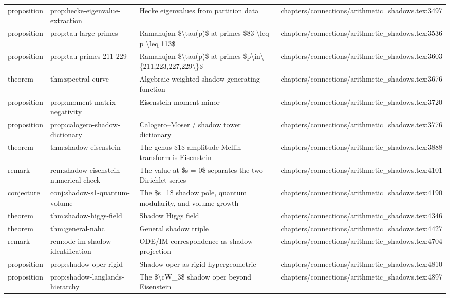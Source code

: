 \documentclass[11pt]{article}
\begin{document}
\begin{longtable}{L{0.10\textwidth}L{0.26\textwidth}L{0.42\textwidth}L{0.22\textwidth}}
proposition & prop:hecke-eigenvalue-extraction & Hecke eigenvalues from partition data & chapters/connections/arithmetic\_shadows.tex:3497\\
proposition & prop:tau-large-primes & Ramanujan \$\textbackslash{}tau(p)\$ at primes \$83 \textbackslash{}leq p \textbackslash{}leq 113\$ & chapters/connections/arithmetic\_shadows.tex:3536\\
proposition & prop:tau-primes-211-229 & Ramanujan \$\textbackslash{}tau(p)\$ at primes \$p\textbackslash{}in\textbackslash{}\{211,223,227,229\textbackslash{}\}\$ & chapters/connections/arithmetic\_shadows.tex:3603\\
theorem & thm:spectral-curve & Algebraic weighted shadow generating function & chapters/connections/arithmetic\_shadows.tex:3676\\
proposition & prop:moment-matrix-negativity & Eisenstein moment minor & chapters/connections/arithmetic\_shadows.tex:3720\\
proposition & prop:calogero-shadow-dictionary & Calogero--Moser / shadow tower dictionary & chapters/connections/arithmetic\_shadows.tex:3776\\
theorem & thm:shadow-eisenstein & The genus-\$1\$ amplitude Mellin transform is Eisenstein & chapters/connections/arithmetic\_shadows.tex:3888\\
remark & rem:shadow-eisenstein-numerical-check & The value at \$s = 0\$ separates the two Dirichlet series & chapters/connections/arithmetic\_shadows.tex:4101\\
conjecture & conj:shadow-s1-quantum-volume & The \$s=1\$ shadow pole, quantum modularity, and volume growth & chapters/connections/arithmetic\_shadows.tex:4190\\
theorem & thm:shadow-higgs-field & Shadow Higgs field & chapters/connections/arithmetic\_shadows.tex:4346\\
theorem & thm:general-nahc & General shadow triple & chapters/connections/arithmetic\_shadows.tex:4427\\
remark & rem:ode-im-shadow-identification & ODE/IM correspondence as shadow projection & chapters/connections/arithmetic\_shadows.tex:4704\\
proposition & prop:shadow-oper-rigid & Shadow oper as rigid hypergeometric & chapters/connections/arithmetic\_shadows.tex:4810\\
proposition & prop:shadow-langlands-hierarchy & The \$\textbackslash{}cW\_3\$ shadow oper beyond Eisenstein & chapters/connections/arithmetic\_shadows.tex:4897\\

\end{longtable}
\end{document}
